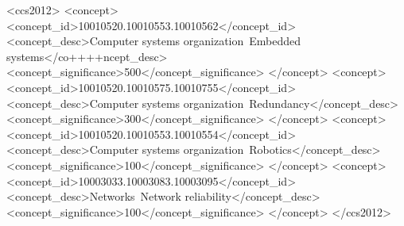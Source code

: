 \documentclass[acmsmall]{acmart}
\begin{document}
\begin{CCSXML}
	<ccs2012>
	<concept>
	<concept_id>10010520.10010553.10010562</concept_id>
	<concept_desc>Computer systems organization~Embedded systems</co++++ncept_desc>
	<concept_significance>500</concept_significance>
	</concept>
	<concept>
	<concept_id>10010520.10010575.10010755</concept_id>
	<concept_desc>Computer systems organization~Redundancy</concept_desc>
	<concept_significance>300</concept_significance>
	</concept>
	<concept>
	<concept_id>10010520.10010553.10010554</concept_id>
	<concept_desc>Computer systems organization~Robotics</concept_desc>
	<concept_significance>100</concept_significance>
	</concept>
	<concept>
	<concept_id>10003033.10003083.10003095</concept_id>
	<concept_desc>Networks~Network reliability</concept_desc>
	<concept_significance>100</concept_significance>
	</concept>
	</ccs2012>
\end{CCSXML}




\maketitle











	
\clearpage

%
\normalem


\end{document}
